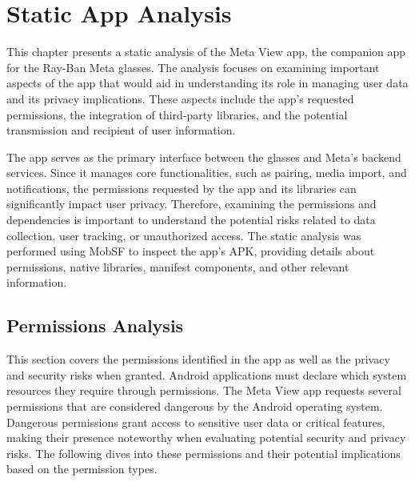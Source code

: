 
\chapter{Static App Analysis}
\label{chap:appAnalysis}

This chapter presents a static analysis of the Meta View app, the companion app for the Ray-Ban Meta glasses. The analysis focuses on examining important aspects of the app that would aid in understanding its role in managing user data and its privacy implications. These aspects include the app's requested permissions, the integration of third-party libraries, and the potential transmission and recipient of user information.

The app serves as the primary interface between the glasses and Meta's backend services. Since it manages core functionalities, such as pairing, media import, and notifications, the permissions requested by the app and its libraries can significantly impact user privacy. Therefore, examining the permissions and dependencies is important to understand the potential risks related to data collection, user tracking, or unauthorized access. The static analysis was performed using MobSF to inspect the app's APK, providing details about permissions, native libraries, manifest components, and other relevant information.


\section{Permissions Analysis}
This section covers the permissions identified in the app as well as the privacy and security risks when granted. Android applications must declare which system resources they require through permissions. The Meta View app requests several permissions that are considered dangerous by the Android operating system. Dangerous permissions grant access to sensitive user data or critical features, making their presence noteworthy when evaluating potential security and privacy risks. The following dives into these permissions and their potential implications based on the permission types.

